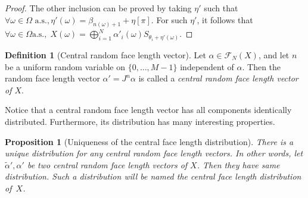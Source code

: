 \documentclass[numbers,compress,v1.0.1]{vmsta}
\newtheorem{proposition}{Proposition}
\theoremstyle{definition}
\newtheorem{definition}{Definition}
\begin{document}
\begin{proof}
The other inclusion can be proved by taking $\eta'$ such that $\forall
\omega\in\varOmega\text{ a.s.}, \eta'(\omega)=\beta_{n(\omega)+1}+\eta[\pi
]$. For such $\eta'$, it follows that $\forall\omega\in\varOmega\text{
a.s.},\;X(\omega)=\bigoplus_{i=1}^N \alpha'_i(\omega) S_{\theta_i+\eta
'(\omega)}$.
\end{proof}

\begin{definition}[Central random face length vector]
Let $\alpha\in\mathcal{F}_{N}(X)$, and let $n$ be a uniform random
variable on $\lbrace0,\dots,M-1\rbrace$ independent of $\alpha$. Then
the random face length vector $\alpha'=J^n\alpha$ is called a \textit
{central random face length vector of $X$}.
\end{definition}
%
Notice that a central random face length vector has all components
identically distributed. Furthermore, its distribution has many
interesting properties.
%
\begin{proposition}[Uniqueness of the central face length distribution]
There is a unique distribution for any central random face length
vectors. In other words, let $\tilde{\alpha}',\alpha'$ be two central
random face length vectors of $X$. Then they have same distribution.
Such a distribution will be named \textit{the central face length
distribution of~$X$}.
\label{prop:uniqCentralDisrt}
\end{proposition}
\end{document}
